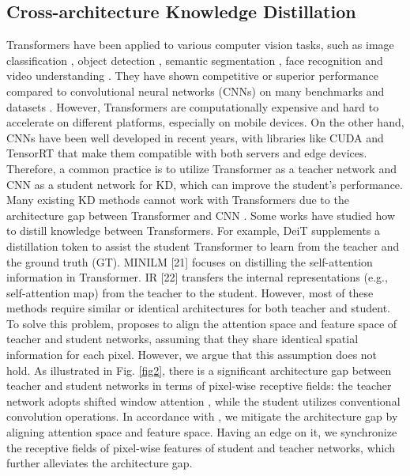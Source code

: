 \documentclass[sigconf]{acmart}
\begin{document}
\subsection{Cross-architecture Knowledge Distillation}
Transformers have been applied to various computer vision tasks, such as image classification  \cite{vit}, object detection \cite{detect}, semantic segmentation \cite{seg}, face recognition \cite{face} and video understanding \cite{video}. They have shown competitive or superior performance compared to convolutional neural networks (CNNs) on many benchmarks and datasets \cite{survey}. However, Transformers are computationally expensive and hard to accelerate on different platforms, especially on mobile devices. On the other hand, CNNs have been well developed in recent years, with libraries like CUDA \cite{cuda} and TensorRT \cite{tensorrt} that make them compatible with both servers and edge devices. Therefore, a common practice is to utilize Transformer as a teacher network and CNN as a student network for KD, which can improve the student’s performance. Many existing KD methods cannot work with Transformers due to the architecture gap between Transformer and CNN \cite{accv}. Some works have studied how to distill knowledge between Transformers. For example, DeiT \cite{deit} supplements a distillation token to assist the student Transformer to learn from the teacher and the ground truth (GT). MINILM [21] focuses on distilling the self-attention information in Transformer. IR [22] transfers the internal representations (e.g., self-attention map) from the teacher to the student. However, most of these methods require similar or identical architectures for both teacher and student. To solve this problem, \citet{accv} proposes to align the attention space and feature space of teacher and student networks, assuming that they share identical spatial information for each pixel. However, we argue that this assumption does not hold. As illustrated in Fig. \ref{fig2}, there is a significant architecture gap between teacher and student networks in terms of pixel-wise receptive fields: the teacher network adopts shifted window attention \cite{swin}, while the student utilizes conventional convolution operations. In accordance with \cite{accv}, we mitigate the architecture gap by aligning attention space and feature space. Having an edge on it, we synchronize the receptive fields of pixel-wise features of student and teacher networks, which further alleviates the architecture gap.%
\end{document}
